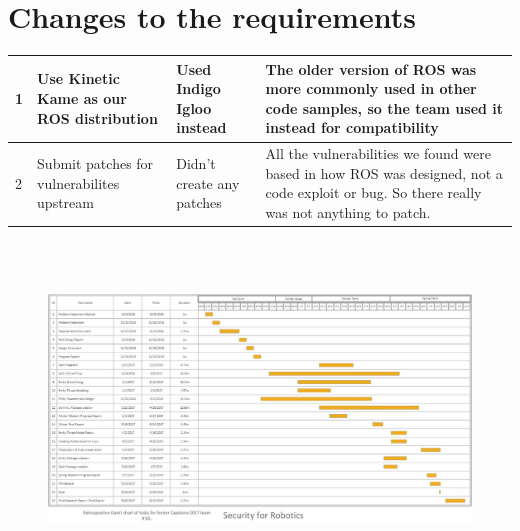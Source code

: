 \documentclass[IEEEtran,letterpaper,10pt,notitlepage,draftclsnofoot,onecolumn]{article}
\begin{document}
\begin{sloppypar}
\section{Changes to the requirements}
\begin{tabular}{|p{.1cm}|l|p{2cm}| p{5cm} |} 
 \hline
 1 & Use Kinetic Kame as our ROS distribution & Used Indigo Igloo instead & The older version of ROS was more commonly used in other code samples, so the team used it instead for compatibility\\
 \hline
 2 & Submit patches for vulnerabilites upstream & Didn't create any patches & All the vulnerabilities we found were based in how ROS was designed, not a code exploit or bug. So there really was not anything to patch.\\
 \hline
\end{tabular}
\\ \\ 
\end{sloppypar}
\begin{figure}[ht!]
\centering
\includegraphics[width=170mm]{finalgannt.eps}
\end{figure}
%
\end{document}
